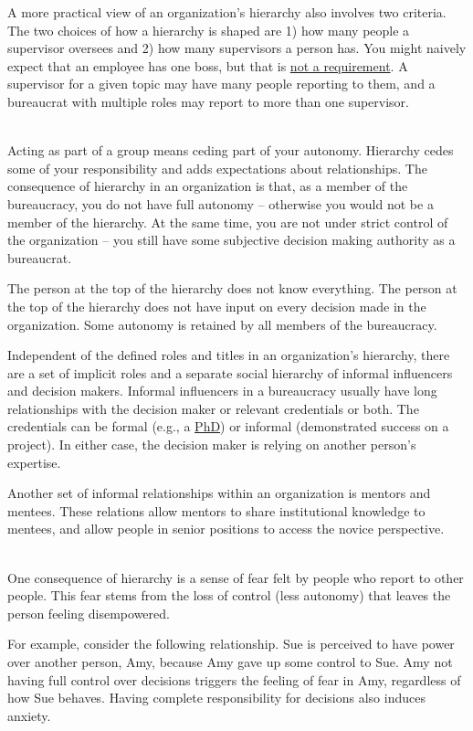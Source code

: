 A more practical view of an organization's hierarchy also involves two criteria. The two choices of how a hierarchy is shaped are 
1) how many people a supervisor oversees and 
2) how many supervisors a person has. 
You might naively expect that an employee has one boss, but that is \href{https://en.wikipedia.org/wiki/Matrix_management}{not a requirement}. A supervisor for a given topic may have many people reporting to them, and a bureaucrat with multiple roles may report to more than one supervisor.

\ \\

Acting as part of a group means ceding part of your autonomy. Hierarchy cedes some of your responsibility and adds expectations about relationships.
The consequence of hierarchy in an organization is that, as a member of the bureaucracy, you do not have full autonomy -- otherwise you would not be a member of the hierarchy. At the same time, you are not under strict control of the organization -- you still have some subjective decision making authority as a bureaucrat.

The person at the top of the hierarchy does not know everything. The person at the top of the hierarchy does not have input on every decision made in the organization. Some autonomy is retained by all members of the bureaucracy.

Independent of the defined roles and titles in an organization's hierarchy, there are a set of implicit roles and a separate social hierarchy of informal influencers and decision makers. Informal influencers in a bureaucracy usually have long relationships with the decision maker or relevant credentials or both. The credentials can be formal (e.g., a \href{https://en.wikipedia.org/wiki/Doctor_of_Philosophy}{PhD}) or informal (demonstrated success on a project). In either case, the decision maker is relying on another person's expertise. 

Another set of informal relationships within an organization is mentors and mentees. These relations allow mentors to share institutional knowledge to mentees, and allow people in senior positions to access the novice perspective. 


\ \\

One consequence of hierarchy is a sense of fear felt by people who report to other people. This fear stems from the loss of control (less autonomy) that leaves the person feeling disempowered. 

For example, consider the following relationship. Sue is perceived to have power over another person, Amy, because Amy gave up some control to Sue. Amy not having full control over decisions triggers the feeling of fear in Amy, regardless of how Sue behaves. Having complete responsibility for decisions also induces anxiety.

